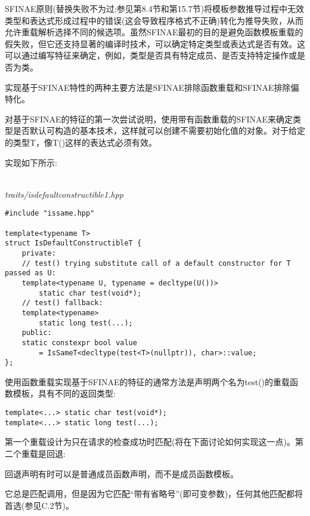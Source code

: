 
SFINAE原则(替换失败不为过;参见第8.4节和第15.7节)将模板参数推导过程中无效类型和表达式形成过程中的错误(这会导致程序格式不正确)转化为推导失败，从而允许重载解析选择不同的候选项。虽然SFINAE最初的目的是避免函数模板重载的假失败，但它还支持显著的编译时技术，可以确定特定类型或表达式是否有效。这可以通过编写特征来确定，例如，类型是否具有特定成员、是否支持特定操作或是否为类。

实现基于SFINAE特性的两种主要方法是SFINAE排除函数重载和SFINAE排除偏特化。


对基于SFINAE的特征的第一次尝试说明，使用带有函数重载的SFINAE来确定类型是否默认可构造的基本技术，这样就可以创建不需要初始化值的对象。对于给定的类型T，像T()这样的表达式必须有效。

实现如下所示:

\hspace*{\fill} \\ %
\noindent
\textit{traits/isdefaultconstructible1.hpp}
\begin{lstlisting}[style=styleCXX]
#include "issame.hpp"

template<typename T>
struct IsDefaultConstructibleT {
	private:
	// test() trying substitute call of a default constructor for T passed as U:
	template<typename U, typename = decltype(U())>
		static char test(void*);
	// test() fallback:
	template<typename>
		static long test(...);
	public:
	static constexpr bool value
		= IsSameT<decltype(test<T>(nullptr)), char>::value;
};
\end{lstlisting}

使用函数重载实现基于SFINAE的特征的通常方法是声明两个名为test()的重载函数模板，具有不同的返回类型:

\begin{lstlisting}[style=styleCXX]
template<...> static char test(void*);
template<...> static long test(...);
\end{lstlisting}

第一个重载设计为只在请求的检查成功时匹配(将在下面讨论如何实现这一点)。第二个重载是回退:

\begin{tcolorbox}[colback=webgreen!5!white,colframe=webgreen!75!black]
\hspace*{0.75cm}回退声明有时可以是普通成员函数声明，而不是成员函数模板。
\end{tcolorbox}

它总是匹配调用，但是因为它匹配“带有省略号”(即可变参数)，任何其他匹配都将首选(参见C.2节)。

